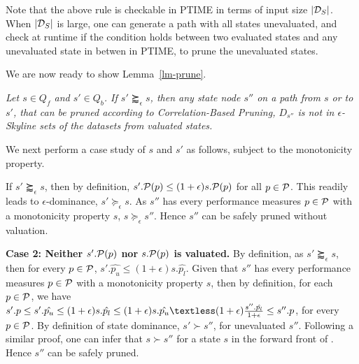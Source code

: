 Note that the above rule is checkable in PTIME 
in terms of input size $|\D_S|$. When $|\D_S|$ 
is large, one can generate a path with 
all states unevaluated, 
and check at runtime if the condition holds between 
two evaluated states and any unevaluated 
state in betwen in PTIME, to 
prune the unevaluated states. 

We are now ready to show Lemma~\ref{lm-prune}. 

{\em Let $s \in Q_f$ and $s' \in Q_b$. 
If $s' \succapprox_{\epsilon} s$, 
then any state node $s''$ 
on a path from $s$ or to $s'$, 
that can be pruned according to Correlation-Based Pruning, 
$D_{s''}$ is not in $\epsilon$-Skyline sets 
of the datasets from valuated states.}




We next perform a case study of 
$s$ and $s'$ as follows, subject to 
the monotonicity property.  

If $s' \succapprox_{\epsilon} s$, then by definition, $s'.\P(p)\leq (1+\epsilon) s.\P(p)$ for all $p \in \P$. This 
readily leads to $\epsilon$-dominance, \ie $s'\succeq_\epsilon s$. As $s''$ has every performance measures 
$p\in \P$ with a monotonicity property \wrt $s$, 
$s\succeq_\epsilon s''$. Hence $s''$ can be safely pruned 
without valuation. 

\sstab
\textbf{Case 2: Neither $s'.\P(p)$ nor $s.\P(p)$ is valuated.}
By definition, as $s' \succapprox_{\epsilon} s$, 
then for every $p\in \P$, $s'.\hat{p_u}\leq (1+\epsilon) s.\hat{p_l}$. 
Given that $s''$ has every performance measures 
$p\in \P$ with a monotonicity property \wrt $s$, 
then by definition, for each $p\in \P$, we have 
$s'.p\leq s'.\hat{p_u}\leq (1+\epsilon) s.\hat{p_l}\leq (1+\epsilon)s.\hat{p_u}\textless (1+\epsilon)\frac{s''.\hat{p_l}}{1+\epsilon} \leq s''.p$, for 
every $p\in \P$. By definition of state dominance, $s' \succ s''$, for unevaluated $s''$.  
Following a similar proof, 
one can infer that $s \succ s''$ 
for a state $s$ in the forward front 
of \bimodis. 
Hence $s''$ can be safely pruned. 


